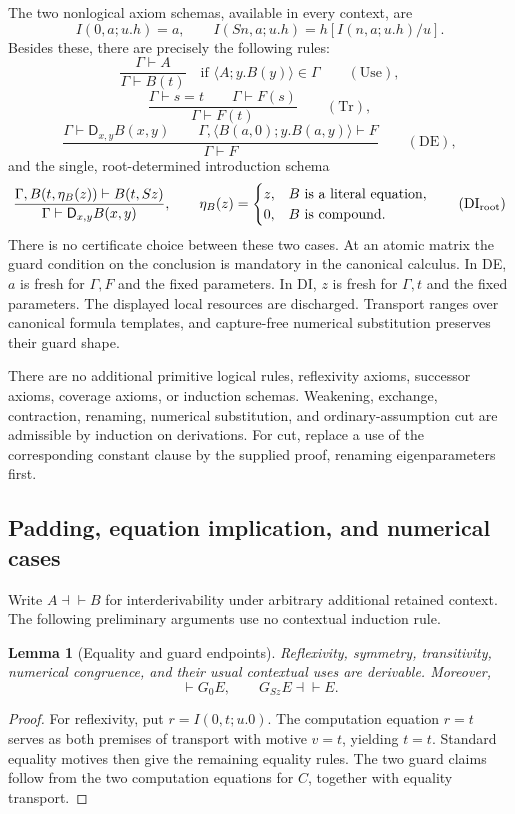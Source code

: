 \documentclass[11pt,letterpaper]{article}
\newtheorem{lemma}[theorem]{Lemma}
\theoremstyle{definition}
\begin{document}
The two nonlogical axiom schemas, available in every context, are
\[
 I(0,a;u.h)=a,\qquad
 I(Sn,a;u.h)=h[I(n,a;u.h)/u].
\tag{I0,IS}\label{eq:guarded-computation}
\]
Besides these, there are precisely the following rules:
\[
 \frac{\Gamma\vdash A}{\Gamma\vdash B(t)}
 \quad\text{if }\langle A;y.B(y)\rangle\in\Gamma
 \qquad(\mathrm{Use}),
\]
\[
 \frac{\Gamma\vdash s=t\qquad\Gamma\vdash F(s)}
      {\Gamma\vdash F(t)}\qquad(\mathrm{Tr}),
\]
\[
 \frac{\Gamma\vdash\mathsf D_{x,y}B(x,y)\qquad
       \Gamma,\langle B(a,0);y.B(a,y)\rangle\vdash F}
      {\Gamma\vdash F}\qquad(\mathrm{DE}),
\]
and the single, root-determined introduction schema
\[
 \frac{\Gamma,B(t,\eta_B(z))\vdash B(t,Sz)}
      {\Gamma\vdash\mathsf D_{x,y}B(x,y)},
 \qquad
 \eta_B(z)=
 \begin{cases}
 z,& B\text{ is a literal equation},\\
 0,& B\text{ is compound}.
 \end{cases}
 \tag{DI$_{\rm root}$}\label{eq:guarded-di}
\]
There is no certificate choice between these two cases.  At an atomic
matrix the guard condition on the conclusion is mandatory in the
canonical calculus.  In DE, $a$ is fresh for $\Gamma,F$ and the fixed
parameters.  In DI, $z$ is fresh for $\Gamma,t$ and the fixed
parameters.  The displayed local resources are discharged.
Transport ranges over canonical formula templates, and capture-free
numerical substitution preserves their guard shape.

There are no additional primitive logical rules, reflexivity axioms,
successor axioms, coverage axioms, or induction schemas.
Weakening, exchange, contraction, renaming, numerical substitution, and
ordinary-assumption cut are admissible by induction on derivations.
For cut, replace a use of the corresponding constant clause by the
supplied proof, renaming eigenparameters first.

\subsection{Padding, equation implication, and numerical cases}

Write $A\dashv\vdash B$ for interderivability under arbitrary additional
retained context.  The following preliminary arguments use no
contextual induction rule.

\begin{lemma}[Equality and guard endpoints]
Reflexivity, symmetry, transitivity, numerical congruence, and their
usual contextual uses are derivable.  Moreover,
\[
 \vdash G_0 E,\qquad G_{Sz}E\dashv\vdash E.
\]
\end{lemma}
\begin{proof}
For reflexivity, put $r=I(0,t;u.0)$.  The computation equation $r=t$
serves as both premises of transport with motive $v=t$, yielding
$t=t$.  Standard equality motives then give the remaining equality
rules.  The two guard claims follow from the two computation equations
for $C$, together with equality transport.
\end{proof}
\end{document}
